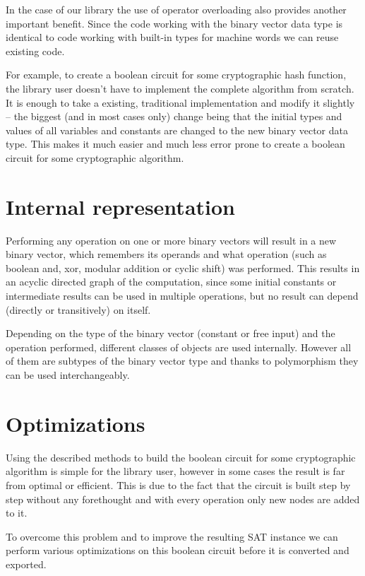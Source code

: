 In the case of our library the use of operator overloading also provides another important benefit.
Since the code working with the binary vector data type is identical to code working with built-in types for machine words we can reuse existing code.

For example, to create a boolean circuit for some cryptographic hash function, the library user doesn't have to implement the complete algorithm from scratch.
It is enough to take a existing, traditional implementation and modify it slightly -- the biggest (and in most cases only) change being that the initial types and values of all variables and constants are changed to the new binary vector data type.
This makes it much easier and much less error prone to create a boolean circuit for some cryptographic algorithm.

\section{Internal representation}

Performing any operation on one or more binary vectors will result in a new binary vector, which remembers its operands and what operation (such as boolean and, xor, modular addition or cyclic shift) was performed.
This results in an acyclic directed graph of the computation, since some initial constants or intermediate results can be used in multiple operations, but no result can depend (directly or transitively) on itself.

Depending on the type of the binary vector (constant or free input) and the operation performed, different classes of objects are used internally.
However all of them are subtypes of the binary vector type and thanks to polymorphism they can be used interchangeably. 

\section{Optimizations}

Using the described methods to build the boolean circuit for some cryptographic algorithm is simple for the library user, however in some cases the result is far from optimal or efficient.
This is due to the fact that the circuit is built step by step without any forethought and with every operation only new nodes are added to it.

To overcome this problem and to improve the resulting SAT instance we can perform various optimizations on this boolean circuit before it is converted and exported.

